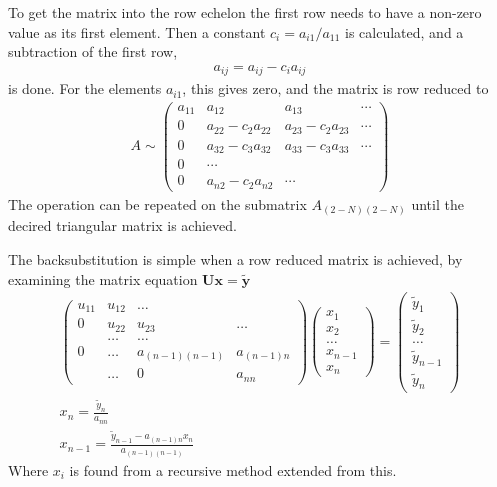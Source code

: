 \documentclass[11pt,a4paper,english]{article}
\numberwithin{equation}{section}
\newcommand{\ve}[1]{\mathbf{#1}} %
\begin{document}
To get the matrix into the row echelon the first row needs to have a non-zero
value as its first element. Then a constant $c_i = a_{i1}/a_{11}$ is 
calculated, and a subtraction of the first row,
\begin{gather}
a_{ij} = a_{ij} - c_i a_{ij}
\end{gather}
is done. For the elements $a_{i1}$, this gives zero, and the matrix is
row reduced to
\begin{gather}
A \sim
\begin{pmatrix}
    a_{11} & a_{12} & a_{13} & \cdots\\
    0 & a_{22} - c_2 a_{22} & a_{23} - c_2 {a}_{23} & \cdots\\
    0 & a_{32} - c_3 a_{32} & a_{33} - c_3 a_{33} & \cdots\\
    0 & \cdots \\
    0 & a_{n2} - c_2 a_{n2} & \cdots
\end{pmatrix}
\end{gather}
The operation can be repeated on the submatrix $A_{(2-N)(2-N)}$
until the decired triangular matrix is achieved.

The backsubstitution is simple when a row reduced matrix is achieved,
by examining the matrix equation $\ve{U}\ve{x} = \ve{\tilde{y}}$
\begin{gather}
\begin{pmatrix} u_{11} & u_{12} & \dots\\
                0 & u_{22} & u_{23} & \dots\\
                &\dots & \dots\\
                0 & \dots & a_{(n-1)(n-1)} & a_{(n-1)n} \\
                & \dots & 0 & a_{nn}
\end{pmatrix} \begin{pmatrix} x_1 \\ x_2 \\ \dots \\ x_{n-1}\\ x_n \end{pmatrix}
 = \begin{pmatrix} \tilde{y}_1 \\ \tilde{y}_2 \\ \dots\\ \tilde{y}_{n-1} \\ \tilde{y}_n \end{pmatrix}\\
 x_n = \frac{\tilde{y}_n}{a_{nn}}\\
 x_{n-1} = \frac{\tilde{y}_{n-1} - a_{(n-1)n}x_n}{a_{(n-1)(n-1)}}
\end{gather}
Where $x_{i}$ is found from a recursive method extended from this.
\end{document}
